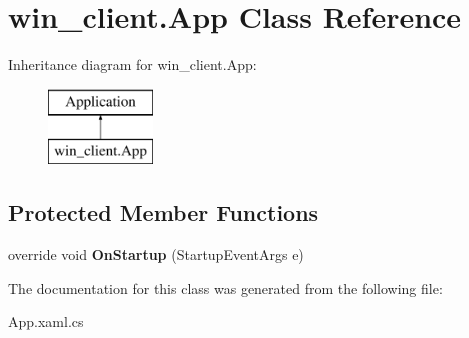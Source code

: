 \hypertarget{classwin__client_1_1_app}{\section{win\-\_\-client.\-App Class Reference}
\label{classwin__client_1_1_app}
}
Inheritance diagram for win\-\_\-client.\-App\-:\begin{figure}[H]
\begin{center}
\leavevmode
\includegraphics[height=2.000000cm]{classwin__client_1_1_app}
\end{center}
\end{figure}
\subsection*{Protected Member Functions}
\begin{DoxyCompactItemize}
\item 
\hypertarget{classwin__client_1_1_app_adc928dea0ee441c35f8f84997dc4a384}{override void {\bfseries On\-Startup} (Startup\-Event\-Args e)}\label{classwin__client_1_1_app_adc928dea0ee441c35f8f84997dc4a384}

\end{DoxyCompactItemize}


The documentation for this class was generated from the following file\-:\begin{DoxyCompactItemize}
\item 
App.\-xaml.\-cs\end{DoxyCompactItemize}
